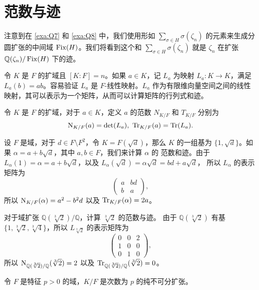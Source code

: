 \section{范数与迹}

注意到在 \autoref{exa:Q7} 和 \autoref{exa:Q8} 中，我们使用形如 $\sum_{\sigma\in H}\sigma(\zeta_n)$
的元素来生成分圆扩张的中间域 $\operatorname{Fix}(H)$。我们将看到这个和 $\sum_{\sigma\in H}\sigma(\zeta_n)$
就是 $\zeta_n$ 在扩张 $\mathbb{Q}(\zeta_n)/\operatorname{Fix}(H)$ 下的迹。

令 $K$ 是 $F$ 的扩域且 $[K:F]=n$。如果 $a\in K$，记 $L_a$ 为映射
$L_a:K\to K$，满足 $L_a(b)=ab$。容易验证 $L_a$ 是 $F$-线性映射。$L_a$
作为有限维向量空间之间的线性映射，其可以表示为一个矩阵，从而可以计算矩阵的行列式和迹。

\begin{definition}
  令 $K$ 是 $F$ 的扩域，对于 $a\in K$，定义 $a$ 的范数 $N_{K/F}$ 和 $T_{K/F}$ 分别为
  \[
    \N_{K/F}(a)=\det(L_a),\ \Tr_{K/F}(a)=\mathrm{Tr}(L_a).
  \]
\end{definition}

\begin{example}
  设 $F$ 是域，对于 $d\in F\setminus F^2$，令 $K=F(\sqrt{d})$，那么 $K$ 的一组基为
  $\{1,\sqrt{d}\}$。如果 $\alpha=a+b\sqrt{d}$，其中 $a,b\in F$，我们来计算 $\alpha$ 的
  范数和迹。由于 $L_\alpha(1)=\alpha=a+b\sqrt{d}$，以及 $L_\alpha(\sqrt{d})=\alpha\sqrt{d}=bd+a\sqrt{d}$，
  所以 $L_\alpha$ 的表示矩阵为
  \[
    \begin{pmatrix}
      a & bd \\
      b & a
    \end{pmatrix},
  \]
  所以 $\operatorname{N}_{K/F}(\alpha)=a^2-b^2d$ 以及 $\operatorname{Tr}_{K/F}(\alpha)=2a$。
\end{example}

\begin{example}
  对于域扩张 $\mathbb{Q}(\sqrt[3]{2})/\mathbb{Q}$，计算 $\sqrt[3]{2}$ 的范数与迹。
  由于 $\mathbb{Q}(\sqrt[3]{2})$ 有基 $\{1,\sqrt[3]{2},\sqrt[3]{4}\}$，所以
  $L_{\sqrt[3]{2}}$ 的表示矩阵为
  \[
    \begin{pmatrix}
      0 & 0 & 2 \\
      1 & 0 & 0 \\
      0 & 1 & 0
    \end{pmatrix},
  \]
  所以 $\operatorname{N}_{\mathbb{Q}(\sqrt[3]{2})/\mathbb{Q}}(\sqrt[3]{2})=2$ 以及 $\operatorname{Tr}_{\mathbb{Q}(\sqrt[3]{2})/\mathbb{Q}}(\sqrt[3]{2})=0$。
\end{example}

\begin{example}
  令 $F$ 是特征 $p>0$ 的域，$K/F$ 是次数为 $p$ 的纯不可分扩张。
\end{example}






